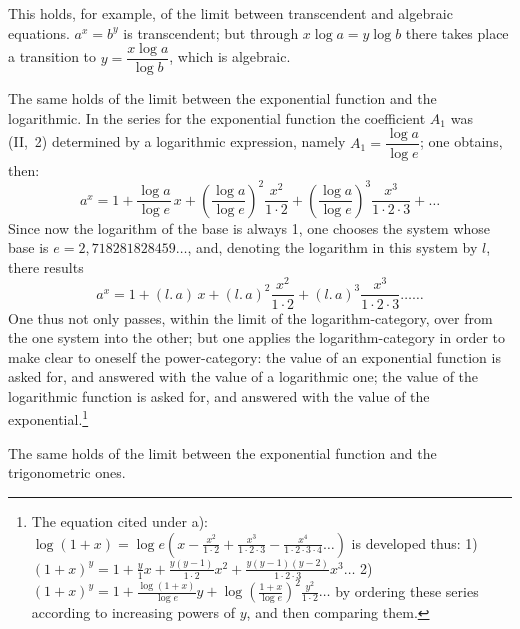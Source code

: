 \documentclass[12pt]{book}
\begin{document}
This holds, for example, of the limit between transcendent and algebraic equations.
$a^{x} = b^{y}$ is transcendent; but through $x\log a = y\log b$ there takes place a
transition to $y = \dfrac{x\log a}{\log b}$, which is algebraic.

The same holds of the limit between the exponential function and the logarithmic. In
the series for the
exponential function the coefficient $A_1$ was (II,\ 2) determined by a logarithmic
expression, namely $A_1 = \dfrac{\log a}{\log e}$; one obtains, then:
\[
a^{x} = 1 + \frac{\log a}{\log e}\,x + \left(\frac{\log a}{\log e}\right)^{2}
\frac{x^{2}}{1\cdot 2} + \left(\frac{\log a}{\log e}\right)^{3}\frac{x^{3}}{1\cdot
2\cdot 3} + \dots
\]
Since now the logarithm of the base is always 1, one chooses the system whose base
is $e = 2{,}718281828459\dots$, and, denoting the logarithm in this system by $l$,
there results
\[
a^{x} = 1 + (l.\,a)\,x + (l.\,a)^{2}\frac{x^{2}}{1\cdot 2} + (l.\,a)^{3}
\frac{x^{3}}{1\cdot 2\cdot 3}\dots\dots
\]
One thus not only passes, within the limit of the logarithm-category, over from the
one system into the other; but one applies the logarithm-category in order to make
clear to oneself the power-category: the value of an exponential function is asked
for, and answered with the value of a logarithmic one; the value of the logarithmic
function is asked for, and answered with the value of the exponential.\footnote{The
equation cited under a):
$\log(1+x) = \log e\left(x - \frac{x^{2}}{1\cdot 2} + \frac{x^{3}}{1\cdot 2\cdot
3} - \frac{x^{4}}{1\cdot 2\cdot 3\cdot 4}\dots\right)$
is developed thus: 1) $(1+x)^{y} = 1 + \frac{y}{1}x +
\frac{y(y-1)}{1\cdot 2}x^{2} + \frac{y(y-1)(y-2)}{1\cdot 2\cdot 3}x^{3}\dots$
2) $(1+x)^{y} = 1 + \frac{\log(1+x)}{\log e}y +
\log\left(\frac{1+x}{\log e}\right)^{2}\frac{y^{2}}{1\cdot 2}\dots$
by ordering these series according to increasing powers of $y$, and then comparing
them.}

The same holds of the limit between the exponential function and the trigonometric
ones.
\end{document}
